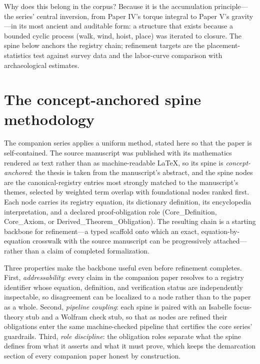 \documentclass[11pt]{article}
\theoremstyle{remark}
\begin{document}
Why does this belong in the corpus? Because it is the accumulation principle---the series' central inversion, from Paper IV's torque integral to Paper V's gravity---in its most ancient and auditable form: a structure that exists because a bounded cyclic process (walk, wind, hoist, place) was iterated to closure. The spine below anchors the registry chain; refinement targets are the placement-statistics test against survey data and the labor-curve comparison with archaeological estimates.

\section{The concept-anchored spine methodology}
\label{sec:method}

The companion series applies a uniform method, stated here so that the paper is self-contained. The source manuscript was published with its mathematics rendered as text rather than as machine-readable LaTeX, so its spine is \emph{concept-anchored}: the thesis is taken from the manuscript's abstract, and the spine nodes are the canonical-registry entries most strongly matched to the manuscript's themes, selected by weighted term overlap with foundational nodes ranked first. Each node carries its registry equation, its dictionary definition, its encyclopedia interpretation, and a declared proof-obligation role (Core\_Definition, Core\_Axiom, or Derived\_Theorem\_Obligation). The resulting chain is a starting backbone for refinement---a typed scaffold onto which an exact, equation-by-equation crosswalk with the source manuscript can be progressively attached---rather than a claim of completed formalization.

Three properties make the backbone useful even before refinement completes. First, \emph{addressability}: every claim in the companion paper resolves to a registry identifier whose equation, definition, and verification status are independently inspectable, so disagreement can be localized to a node rather than to the paper as a whole. Second, \emph{pipeline coupling}: each spine is paired with an Isabelle focus-theory stub and a Wolfram check stub, so that as nodes are refined their obligations enter the same machine-checked pipeline that certifies the core series' guardrails. Third, \emph{role discipline}: the obligation roles separate what the spine defines from what it asserts and what it must prove, which keeps the demarcation section of every companion paper honest by construction.
\end{document}
